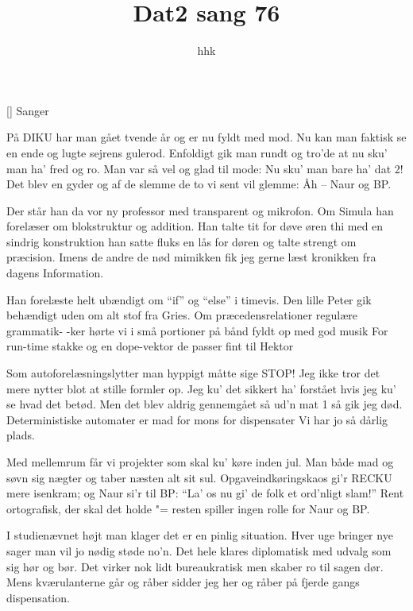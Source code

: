 \documentclass[a4paper,11pt]{article}
\title{Dat2 sang 76}
\author{hhk}
\begin{document}
\maketitle

\begin{roles}
[] Sanger
\end{roles}

\begin{song}
  På DIKU har man gået tvende
år og er nu fyldt med mod.
Nu kan man faktisk se en ende
og lugte sejrens gulerod.
Enfoldigt gik man rundt og tro'de
at nu sku' man ha' fred og ro.
Man var så vel og glad til mode:
Nu sku' man bare ha' dat 2!
Det blev en gyder og af de slemme
de to vi sent vil glemme:
Åh -- Naur og BP.

Der står han da vor ny professor
med transparent og mikrofon.
Om Simula han forelæser
om blokstruktur og addition.
Han talte tit for døve øren
thi med en sindrig konstruktion
han satte fluks en lås for døren
og talte strengt om præcision.
Imens de andre de nød mimikken
fik jeg gerne læst kronikken
fra dagens Information.

Han forelæste helt ubændigt
om "`if"' og "`else"' i timevis.
Den lille Peter gik behændigt
uden om alt stof fra Gries.
Om præcedensrelationer
regulære grammatik-
-ker hørte vi i små portioner
på bånd fyldt op med god musik
For run-time stakke og en dope-vektor
de passer fint til Hektor

Som autoforelæsningslytter
man hyppigt måtte sige STOP!
Jeg ikke tror det mere nytter
blot at stille formler op.
Jeg ku' det sikkert ha' forstået
hvis jeg ku' se hvad det betød.
Men det blev aldrig gennemgået
så ud'n mat 1 så gik jeg død.
Deterministiske automater
er mad for mons for dispensater
Vi har jo så dårlig plads.

Med mellemrum får vi projekter
som skal ku' køre inden jul.
Man både mad og søvn sig nægter
og taber næsten alt sit sul.
Opgaveindkøringskaos
gi'r RECKU mere isenkram;
og Naur si'r til BP: "`La' os
nu gi' de folk et ord'nligt slam!"'
Rent ortografisk, der skal det holde "=
resten spiller ingen rolle
for Naur og BP.

I studienævnet højt man klager
det er en pinlig situation.
Hver uge bringer nye sager
man vil jo nødig støde no'n.
Det hele klares diplomatisk
med udvalg som sig hør og bør.
Det virker nok lidt bureaukratisk
men skaber ro til sagen dør.
Mens kværulanterne går og råber
sidder jeg her og råber
på fjerde gangs dispensation.
\end{song}
\end{document}
